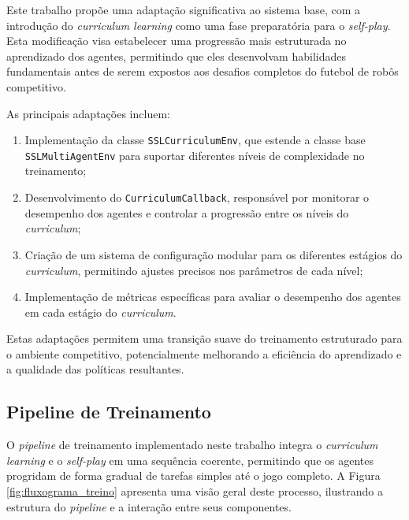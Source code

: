 Este trabalho propõe uma adaptação significativa ao sistema base, com a introdução do \textit{curriculum learning} como uma fase preparatória para o \textit{self-play}. Esta modificação visa estabelecer uma progressão mais estruturada no aprendizado dos agentes, permitindo que eles desenvolvam habilidades fundamentais antes de serem expostos aos desafios completos do futebol de robôs competitivo.

As principais adaptações incluem:

\begin{enumerate}
    \item Implementação da classe \texttt{SSLCurriculumEnv}, que estende a classe base \texttt{SSLMultiAgentEnv} para suportar diferentes níveis de complexidade no treinamento;
    
    \item Desenvolvimento do \texttt{CurriculumCallback}, responsável por monitorar o desempenho dos agentes e controlar a progressão entre os níveis do \textit{curriculum};
    
    \item Criação de um sistema de configuração modular para os diferentes estágios do \textit{curriculum}, permitindo ajustes precisos nos parâmetros de cada nível;
    
    \item Implementação de métricas específicas para avaliar o desempenho dos agentes em cada estágio do \textit{curriculum}.
\end{enumerate}

Estas adaptações permitem uma transição suave do treinamento estruturado para o ambiente competitivo, potencialmente melhorando a eficiência do aprendizado e a qualidade das políticas resultantes.

\subsection{Pipeline de Treinamento}

O \textit{pipeline} de treinamento implementado neste trabalho integra o \textit{curriculum learning} e o \textit{self-play} em uma sequência coerente, permitindo que os agentes progridam de forma gradual de tarefas simples até o jogo completo. A Figura \ref{fig:fluxograma_treino} apresenta uma visão geral deste processo, ilustrando a estrutura do \textit{pipeline} e a interação entre seus componentes.

